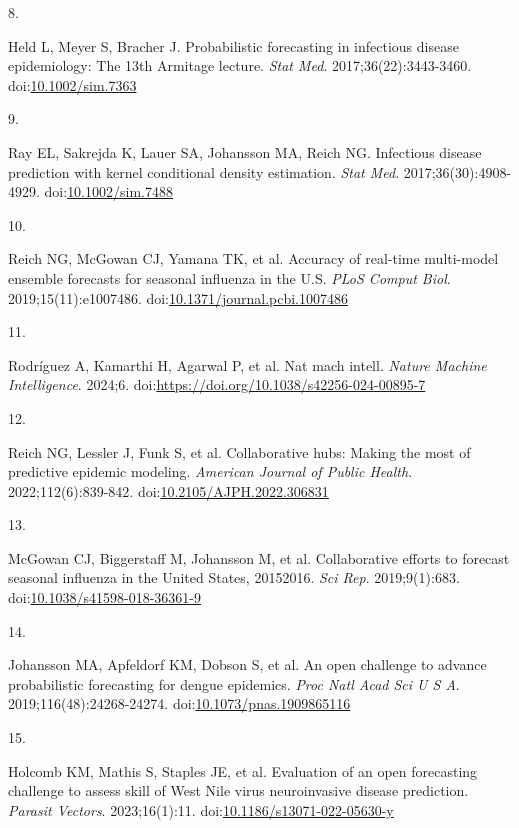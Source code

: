 \documentclass[
]{article}
\newlength{\cslhangindent}
\newlength{\csllabelwidth}
\newenvironment{CSLReferences}[2] %
 {\begin{list}{}{%
  \setlength{\itemindent}{0pt}
  \setlength{\leftmargin}{0pt}
  \setlength{\parsep}{0pt}
  \ifodd #1
   \setlength{\leftmargin}{\cslhangindent}
   \setlength{\itemindent}{-1\cslhangindent}
  \fi
  \setlength{\itemsep}{#2\baselineskip}}}
 {\end{list}}
\newcommand{\CSLLeftMargin}[1]{\parbox[t]{\csllabelwidth}{\strut#1\strut}}
\newcommand{\CSLRightInline}[1]{\parbox[t]{\linewidth - \csllabelwidth}{\strut#1\strut}}
\begin{document}
\begin{CSLReferences}{0}{1}
\CSLLeftMargin{8. }%
\CSLRightInline{Held L, Meyer S, Bracher J. Probabilistic forecasting in
infectious disease epidemiology: The 13th {Armitage} lecture. \emph{Stat
Med}. 2017;36(22):3443-3460.
doi:\href{https://doi.org/10.1002/sim.7363}{10.1002/sim.7363}}

\CSLLeftMargin{9. }%
\CSLRightInline{Ray EL, Sakrejda K, Lauer SA, Johansson MA, Reich NG.
Infectious disease prediction with kernel conditional density
estimation. \emph{Stat Med}. 2017;36(30):4908-4929.
doi:\href{https://doi.org/10.1002/sim.7488}{10.1002/sim.7488}}

\CSLLeftMargin{10. }%
\CSLRightInline{Reich NG, McGowan CJ, Yamana TK, et al. Accuracy of
real-time multi-model ensemble forecasts for seasonal influenza in the
{U}.{S}. \emph{PLoS Comput Biol}. 2019;15(11):e1007486.
doi:\href{https://doi.org/10.1371/journal.pcbi.1007486}{10.1371/journal.pcbi.1007486}}

\CSLLeftMargin{11. }%
\CSLRightInline{Rodríguez A, Kamarthi H, Agarwal P, et al. Nat mach
intell. \emph{Nature Machine Intelligence}. 2024;6.
doi:\url{https://doi.org/10.1038/s42256-024-00895-7}}

\CSLLeftMargin{12. }%
\CSLRightInline{Reich NG, Lessler J, Funk S, et al. Collaborative hubs:
Making the most of predictive epidemic modeling. \emph{American Journal
of Public Health}. 2022;112(6):839-842.
doi:\href{https://doi.org/10.2105/AJPH.2022.306831}{10.2105/AJPH.2022.306831}}

\CSLLeftMargin{13. }%
\CSLRightInline{McGowan CJ, Biggerstaff M, Johansson M, et al.
Collaborative efforts to forecast seasonal influenza in the United
States, 2015{\textendash}2016. \emph{Sci Rep}. 2019;9(1):683.
doi:\href{https://doi.org/10.1038/s41598-018-36361-9}{10.1038/s41598-018-36361-9}}

\CSLLeftMargin{14. }%
\CSLRightInline{Johansson MA, Apfeldorf KM, Dobson S, et al. An open
challenge to advance probabilistic forecasting for dengue epidemics.
\emph{Proc Natl Acad Sci U S A}. 2019;116(48):24268-24274.
doi:\href{https://doi.org/10.1073/pnas.1909865116}{10.1073/pnas.1909865116}}

\CSLLeftMargin{15. }%
\CSLRightInline{Holcomb KM, Mathis S, Staples JE, et al. Evaluation of
an open forecasting challenge to assess skill of {West} {Nile} virus
neuroinvasive disease prediction. \emph{Parasit Vectors}. 2023;16(1):11.
doi:\href{https://doi.org/10.1186/s13071-022-05630-y}{10.1186/s13071-022-05630-y}}


\end{CSLReferences}
\end{document}
